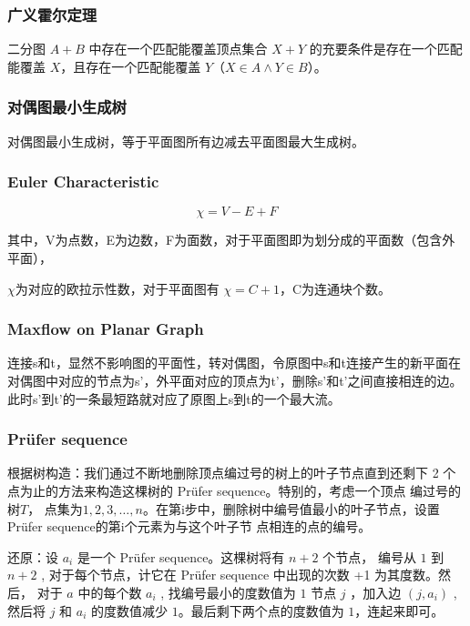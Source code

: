 \subsubsection{广义霍尔定理}

二分图 $A+B$ 中存在一个匹配能覆盖顶点集合 $X+Y$ 的充要条件是存在一个匹配能覆盖 $X$，且存在一个匹配能覆盖 $Y$（$X\in A\land Y\in B$）。

\subsubsection{对偶图最小生成树}

对偶图最小生成树，等于平面图所有边减去平面图最大生成树。

\subsubsection{Euler Characteristic}

$$
\chi = V-E+F 
$$

其中，V为点数，E为边数，F为面数，对于平面图即为划分成的平面数（包含外平面），

$ \chi $为对应的欧拉示性数，对于平面图有 $ \chi = C + 1 $，C为连通块个数。

\subsubsection{Maxflow on Planar Graph}

连接s和t，显然不影响图的平面性，转对偶图，令原图中s和t连接产生的新平面在对偶图中对应的节点为s'，外平面对应的顶点为t'，删除s'和t'之间直接相连的边。
此时s'到t'的一条最短路就对应了原图上s到t的一个最大流。

\subsubsection{Prüfer sequence}

根据树构造：我们通过不断地删除顶点编过号的树上的叶子节点直到还剩下 2 个点为止的方法来构造这棵树的 Prüfer sequence。特别的，考虑一个顶点
编过号的树$T$， 点集为$ { 1, 2, 3, \ldots , n} $。在第i步中，删除树中编号值最小的叶子节点，设置Prüfer sequence的第i个元素为与这个叶子节
点相连的点的编号。

还原：设 $a_i$ 是一个 Prüfer sequence。这棵树将有 $n + 2$ 个节点， 编号从 $1$ 到 $n + 2$ , 对于每个节点，计它在 Prüfer sequence 中出现的次数 +1 为其度数。然后， 对于 $a$ 中的每个数 $a_i$ , 找编号最小的度数值为 $1$ 节点 $j$ ，加入边 $(j,a_i)$ , 然后将 $j$ 和 $a_i$ 的度数值减少 $1$。最后剩下两个点的度数值为 $1$，连起来即可。

